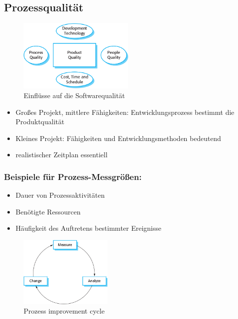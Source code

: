\subsection{Prozessqualität}
\begin{figure}[h]
    \centering
    \includegraphics[width=0.5\textwidth]{mainmatter/pics/product_quality.png}
    \caption{Einflüsse auf die Softwarequalität}
\end{figure}
\begin{itemize}
    \item Großes Projekt, mittlere Fähigkeiten: Entwicklungsprozess bestimmt die Produktqualität
    \item Kleines Projekt: Fähigkeiten und Entwicklungsmethoden bedeutend 
    \item realistischer Zeitplan essentiell
\end{itemize}
\subsubsection{Beispiele für Prozess-Messgrößen:}
\begin{itemize}
    \item Dauer von Prozessaktivitäten 
    \item Benötigte Ressourcen
    \item Häufigkeit des Auftretens bestimmter Ereignisse 
\end{itemize}
\begin{figure}[h]
    \centering
    \includegraphics[width=0.40\textwidth]{mainmatter/pics/improvement_cycle.png}
    \caption{Prozess improvement cycle}
\end{figure}

